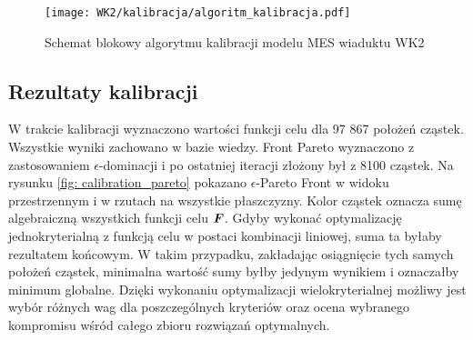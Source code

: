 \begin{figure}[p]
	\centering
	\texttt{[image: WK2/kalibracja/algoritm\_kalibracja.pdf]}
	\captionsetup{justification=centering}
	\caption{Schemat blokowy algorytmu kalibracji modelu MES wiaduktu WK2}
	\label{fig:kalibracja_algoritm}
\end{figure}


\subsection{Rezultaty kalibracji}
W trakcie kalibracji wyznaczono wartości funkcji celu dla 97 867 położeń cząstek. Wszystkie wyniki zachowano w bazie wiedzy. Front Pareto wyznaczono z zastosowaniem $\epsilon$-dominacji i po ostatniej iteracji złożony był z 8100 cząstek. Na rysunku \ref{fig: calibration_pareto} pokazano $\epsilon$-Pareto Front w widoku przestrzennym i w rzutach na wszystkie płaszczyzny. Kolor cząstek oznacza sumę algebraiczną wszystkich funkcji celu $\bm{F}$. Gdyby wykonać optymalizację jednokryterialną z funkcją celu w postaci kombinacji liniowej, suma ta byłaby rezultatem końcowym. W takim przypadku, zakładając osiągnięcie tych samych położeń cząstek, minimalna wartość sumy byłby jedynym wynikiem i oznaczałby minimum globalne. Dzięki wykonaniu optymalizacji wielokryterialnej możliwy jest wybór różnych wag dla poszczególnych kryteriów oraz ocena wybranego kompromisu wśród całego zbioru rozwiązań optymalnych.

